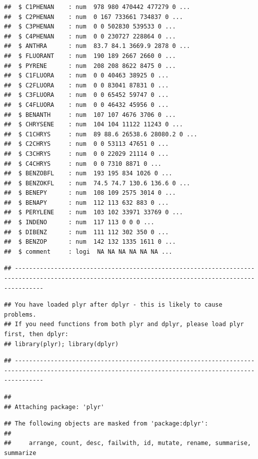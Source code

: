 \documentclass[]{article}
\begin{document}
\begin{verbatim}
##  $ C1PHENAN    : num  978 980 470442 477279 0 ...
##  $ C2PHENAN    : num  0 167 733661 734837 0 ...
##  $ C3PHENAN    : num  0 0 502830 539533 0 ...
##  $ C4PHENAN    : num  0 0 230727 228864 0 ...
##  $ ANTHRA      : num  83.7 84.1 3669.9 2878 0 ...
##  $ FLUORANT    : num  190 189 2667 2660 0 ...
##  $ PYRENE      : num  208 208 8622 8475 0 ...
##  $ C1FLUORA    : num  0 0 40463 38925 0 ...
##  $ C2FLUORA    : num  0 0 83041 87831 0 ...
##  $ C3FLUORA    : num  0 0 65452 59747 0 ...
##  $ C4FLUORA    : num  0 0 46432 45956 0 ...
##  $ BENANTH     : num  107 107 4676 3706 0 ...
##  $ CHRYSENE    : num  104 104 11122 11243 0 ...
##  $ C1CHRYS     : num  89 88.6 26538.6 28080.2 0 ...
##  $ C2CHRYS     : num  0 0 53113 47651 0 ...
##  $ C3CHRYS     : num  0 0 22029 21114 0 ...
##  $ C4CHRYS     : num  0 0 7310 8871 0 ...
##  $ BENZOBFL    : num  193 195 834 1026 0 ...
##  $ BENZOKFL    : num  74.5 74.7 130.6 136.6 0 ...
##  $ BENEPY      : num  108 109 2575 3014 0 ...
##  $ BENAPY      : num  112 113 632 883 0 ...
##  $ PERYLENE    : num  103 102 33971 33769 0 ...
##  $ INDENO      : num  117 113 0 0 0 ...
##  $ DIBENZ      : num  111 112 302 350 0 ...
##  $ BENZOP      : num  142 132 1335 1611 0 ...
##  $ comment     : logi  NA NA NA NA NA NA ...
\end{verbatim}

\begin{verbatim}
## ----------------------------------------------------------------------------------------------------------------------------------------------------
\end{verbatim}

\begin{verbatim}
## You have loaded plyr after dplyr - this is likely to cause problems.
## If you need functions from both plyr and dplyr, please load plyr first, then dplyr:
## library(plyr); library(dplyr)
\end{verbatim}

\begin{verbatim}
## ----------------------------------------------------------------------------------------------------------------------------------------------------
\end{verbatim}

\begin{verbatim}
## 
## Attaching package: 'plyr'
\end{verbatim}

\begin{verbatim}
## The following objects are masked from 'package:dplyr':
## 
##     arrange, count, desc, failwith, id, mutate, rename, summarise, summarize
\end{verbatim}
\end{document}
